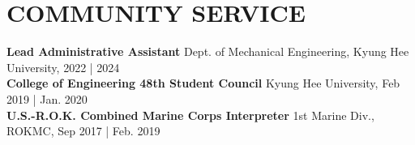 \documentclass[a4paper,10pt]{extarticle}
\begin{document}


\section*{COMMUNITY SERVICE}
\textbf{Lead Administrative Assistant} \hfill Dept. of Mechanical Engineering, Kyung Hee University, 2022 | 2024\\
\textbf{College of Engineering 48th Student Council} \hfill Kyung Hee University, Feb 2019 | Jan. 2020\\
\textbf{U.S.-R.O.K. Combined Marine Corps Interpreter} \hfill 1st Marine Div., ROKMC, Sep 2017 | Feb. 2019
\end{document}
